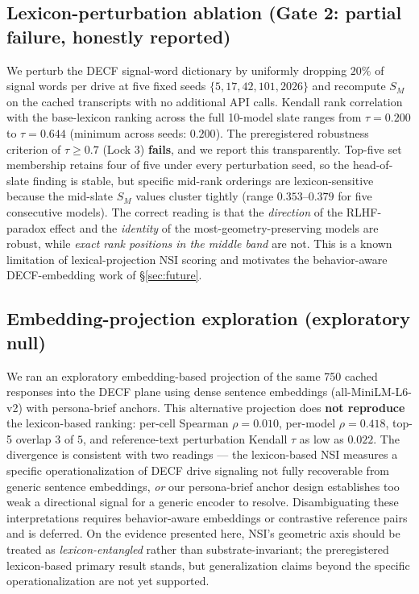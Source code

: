 \documentclass{article}
\begin{document}
\subsection{Lexicon-perturbation ablation (Gate 2: partial failure, honestly reported)}
\label{sec:empirical:gate2}
We perturb the DECF signal-word dictionary by uniformly dropping $20\%$ of signal words per drive at five fixed seeds $\{5, 17, 42, 101, 2026\}$ and recompute $S_M$ on the cached transcripts with no additional API calls. Kendall rank correlation with the base-lexicon ranking across the full 10-model slate ranges from $\tau = 0.200$ to $\tau = 0.644$ (minimum across seeds: $0.200$). The preregistered robustness criterion of $\tau \geq 0.7$ (Lock 3) \textbf{fails}, and we report this transparently. Top-five set membership retains four of five under every perturbation seed, so the head-of-slate finding is stable, but specific mid-rank orderings are lexicon-sensitive because the mid-slate $S_M$ values cluster tightly (range $0.353$--$0.379$ for five consecutive models). The correct reading is that the \emph{direction} of the RLHF-paradox effect and the \emph{identity} of the most-geometry-preserving models are robust, while \emph{exact rank positions in the middle band} are not. This is a known limitation of lexical-projection NSI scoring and motivates the behavior-aware DECF-embedding work of \S\ref{sec:future}.

\subsection{Embedding-projection exploration (exploratory null)}
\label{sec:empirical:embedding}
We ran an exploratory embedding-based projection of the same 750 cached responses into the DECF plane using dense sentence embeddings (all-MiniLM-L6-v2) with persona-brief anchors. This alternative projection does \textbf{not reproduce} the lexicon-based ranking: per-cell Spearman $\rho = 0.010$, per-model $\rho = 0.418$, top-5 overlap $3$ of $5$, and reference-text perturbation Kendall $\tau$ as low as $0.022$. The divergence is consistent with two readings --- the lexicon-based NSI measures a specific operationalization of DECF drive signaling not fully recoverable from generic sentence embeddings, \emph{or} our persona-brief anchor design establishes too weak a directional signal for a generic encoder to resolve. Disambiguating these interpretations requires behavior-aware embeddings or contrastive reference pairs and is deferred. On the evidence presented here, NSI's geometric axis should be treated as \emph{lexicon-entangled} rather than substrate-invariant; the preregistered lexicon-based primary result stands, but generalization claims beyond the specific operationalization are not yet supported.
\end{document}
